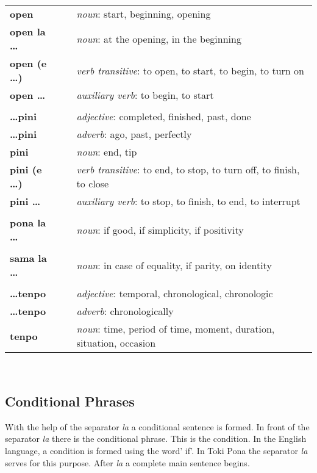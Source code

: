 \begin{supertabular}{p{2,5cm}|ll}
\textbf{open} && \textit{noun}: start, beginning, opening \\ %
\textbf{open la \dots} && \textit{noun}: at the opening, in the beginning  \\ %
\textbf{open (e \dots)} && \textit{verb transitive}: to open, to start, to begin, to turn on \\ %
\textbf{open \dots } && \textit{auxiliary verb}: to begin, to start \\ %
 && \\ %
\textbf{\dots pini} && \textit{adjective}: completed, finished, past, done \\ %
\textbf{\dots pini} && \textit{adverb}: ago, past, perfectly \\ %
\textbf{pini} && \textit{noun}: end, tip \\ %
\textbf{pini (e \dots)} && \textit{verb transitive}: to end, to stop, to turn off, to finish, to close \\ %
\textbf{pini \dots } && \textit{auxiliary verb}: to stop, to finish, to end, to interrupt \\ %
 && \\ %
\textbf{pona la \dots} && \textit{noun}: if good, if simplicity, if positivity \\ %
 && \\ %
\textbf{sama la \dots} && \textit{noun}: in case of equality, if parity, on identity  \\  
 && \\ %
\textbf{\dots tenpo} && \textit{adjective}: temporal, chronological, chronologic \\ %
\textbf{\dots tenpo} && \textit{adverb}: chronologically \\ %
\textbf{tenpo} && \textit{noun}: time, period of time, moment, duration, situation, occasion \\ %
\end{supertabular} \\
%
\newpage
%
\subsection*{Conditional Phrases}
%
With the help of the separator \textit{la} a conditional sentence is formed.
In front of the separator \textit{la} there is the conditional phrase. 
This is the condition. 
In the English language, a condition is formed using the word' if'.
In Toki Pona the separator \textit{la} serves for this purpose. 
After \textit{la} a complete main sentence begins.

